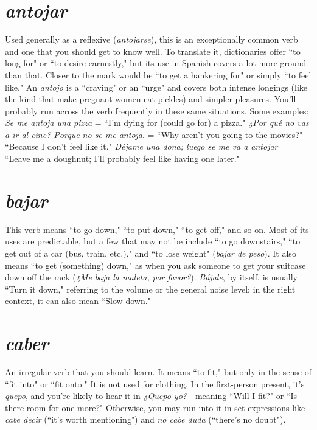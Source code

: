 \section{\emph{antojar}}

Used generally as a reflexive (\emph{antojarse}), this is an exceptionally common verb and one that you should get to know well. To translate it, dictionaries offer ``to long for" or ``to desire earnestly," but its
use in Spanish covers a lot more ground than that. Closer to the mark
would be ``to get a hankering for" or simply ``to feel like." An \emph{antojo}
is a ``craving" or an ``urge" and covers both intense longings (like the
kind that make pregnant women eat pickles) and simpler pleasures.
You'll probably run across the verb frequently in these same situations. Some examples: \emph{Se me antoja una pizza} = ``I'm dying for (could
go for) a pizza." \emph{¿Por qué no vas a ir al cine? Porque no se me antoja}.
= ``Why aren't you going to the movies?" ``Because I don't feel like it."
\emph{Déjame una dona; luego se me va a antojar} = ``Leave me a doughnut;
I'll probably feel like having one later."

\section{\emph{bajar}}

This verb means ``to go down," ``to put down," ``to get off,"
and so on. Most of its uses are predictable, but a few that may not be
include ``to go downstairs," ``to get out of a car (bus, train, etc.)," and
``to lose weight" (\emph{bajar de peso}). It also means ``to get (something)
down," as when you ask someone to get your suitcase down off the
rack (\emph{¿Me baja la maleta, por favor?}). \emph{Bájale}, by itself, is usually ``Turn
it down," referring to the volume or the general noise level; in the
right context, it can also mean ``Slow down."

\section{\emph{caber}}

An irregular verb that you should learn. It means ``to fit," but
only in the sense of ``fit into" or ``fit onto." It is not used for clothing.
In the first-person present, it's \emph{quepo}, and you're likely to hear it in
\emph{¿Quepo yo?}---meaning ``Will I fit?" or ``Is there room for one more?"
Otherwise, you may run into it in set expressions like \emph{cabe decir} (``it's
worth mentioning") and \emph{no cabe duda} (``there's no doubt").

